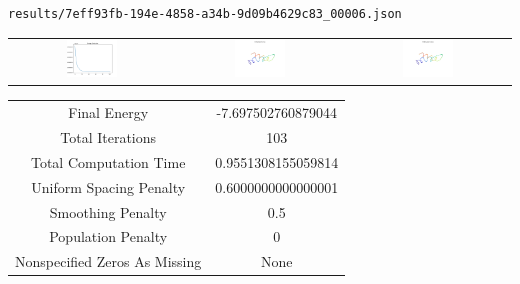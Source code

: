 \documentclass{report}
\begin{document}
\begin{lstlisting}
results/7eff93fb-194e-4858-a34b-9d09b4629c83_00006.json
\end{lstlisting}
\begin{tabular}{ccc}
\includegraphics[width=0.32\textwidth]{7eff93fb-194e-4858-a34b-9d09b4629c83_00006_energies.png}
&
\includegraphics[width=0.32\textwidth]{7eff93fb-194e-4858-a34b-9d09b4629c83_00006_initial_curves.png}
&
\includegraphics[width=0.32\textwidth]{7eff93fb-194e-4858-a34b-9d09b4629c83_00006_estimated_curves.png}
\\
\end{tabular}
\begin{tabular}{cc}
Final Energy&-7.697502760879044\\
Total Iterations&103\\
Total Computation Time&0.9551308155059814\\
Uniform Spacing Penalty&0.6000000000000001\\
Smoothing Penalty&0.5\\
Population Penalty&0\\
Nonspecified Zeros As Missing&None\\
\end{tabular}
\end{document}
